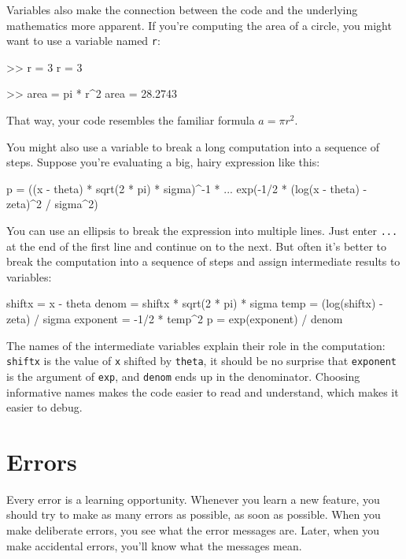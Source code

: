 \documentclass[../../book.tex]{subfiles}
\begin{document}
Variables also make the connection between the code and the underlying
mathematics more apparent.  If you're computing the area of a circle,
you might want to use a variable named \lstinline{r}:

\begin{code}
>> r = 3
r = 3

>> area = pi * r^2
area = 28.2743
\end{code}

That way, your code resembles the familiar formula $a = \pi r^2$.

You might also use a variable to break a long computation into a sequence of steps.
Suppose you're evaluating a big, hairy expression like this:

\begin{code}
p = ((x - theta) * sqrt(2 * pi) * sigma)^-1 * ...
exp(-1/2 * (log(x - theta) - zeta)^2 / sigma^2)
\end{code}

You can use an ellipsis to break the expression into multiple lines.
Just enter \lstinline{...} at the end of the first line and continue on to the
next.
But often it's better to break the computation into a sequence of
steps and assign intermediate results to variables:

\begin{code}
shiftx = x - theta
denom = shiftx * sqrt(2 * pi) * sigma
temp = (log(shiftx) - zeta) / sigma
exponent = -1/2 * temp^2
p = exp(exponent) / denom
\end{code}

The names of the intermediate variables explain their role in the
computation:  \lstinline{shiftx} is the value of \lstinline{x} shifted by
\lstinline{theta},  it should be no surprise that \lstinline{exponent} is the argument of \lstinline{exp}, and \lstinline{denom} ends up in the denominator.  Choosing informative names makes the code easier to read and understand, which makes it easier to debug.



\section{Errors}


Every error is a learning opportunity.
Whenever you learn a new feature, you should try to make as many errors as possible, as soon as possible.
When you make deliberate errors, you see what the error messages are.
Later, when you make accidental errors, you'll know what the messages mean.
\end{document}
